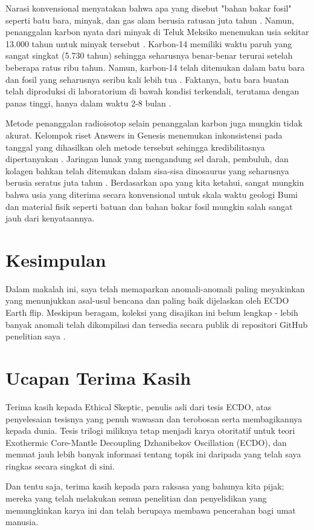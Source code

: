 \documentclass[10pt,twocolumn,letterpaper]{article}
\begin{document}
Narasi konvensional menyatakan bahwa apa yang disebut "bahan bakar fosil" seperti batu bara, minyak, dan gas alam berusia ratusan juta tahun \cite{104}. Namun, penanggalan karbon nyata dari minyak di Teluk Meksiko menemukan usia sekitar 13.000 tahun untuk minyak tersebut \cite{105}. Karbon-14 memiliki waktu paruh yang sangat singkat (5.730 tahun) sehingga seharusnya benar-benar terurai setelah beberapa ratus ribu tahun. Namun, karbon-14 telah ditemukan dalam batu bara dan fosil yang seharusnya seribu kali lebih tua \cite{106}. Faktanya, batu bara buatan telah diproduksi di laboratorium di bawah kondisi terkendali, terutama dengan panas tinggi, hanya dalam waktu 2-8 bulan \cite{107}.

Metode penanggalan radioisotop selain penanggalan karbon juga mungkin tidak akurat. Kelompok riset Answers in Genesis menemukan inkonsistensi pada tanggal yang dihasilkan oleh metode tersebut sehingga kredibilitasnya dipertanyakan \cite{108}. Jaringan lunak yang mengandung sel darah, pembuluh, dan kolagen bahkan telah ditemukan dalam sisa-sisa dinosaurus yang seharusnya berusia seratus juta tahun \cite{109,110}. Berdasarkan apa yang kita ketahui, sangat mungkin bahwa usia yang diterima secara konvensional untuk skala waktu geologi Bumi dan material fisik seperti batuan dan bahan bakar fosil mungkin salah sangat jauh dari kenyataannya.

\section{Kesimpulan}

Dalam makalah ini, saya telah memaparkan anomali-anomali paling meyakinkan yang menunjukkan asal-usul bencana dan paling baik dijelaskan oleh ECDO Earth flip. Meskipun beragam, koleksi yang disajikan ini belum lengkap - lebih banyak anomali telah dikompilasi dan tersedia secara publik di repositori GitHub penelitian saya \cite{2}.

\section{Ucapan Terima Kasih}

Terima kasih kepada Ethical Skeptic, penulis asli dari tesis ECDO, atas penyelesaian tesisnya yang penuh wawasan dan terobosan serta membagikannya kepada dunia. Tesis trilogi miliknya \cite{1} tetap menjadi karya otoritatif untuk teori Exothermic Core-Mantle Decoupling Dzhanibekov Oscillation (ECDO), dan memuat jauh lebih banyak informasi tentang topik ini daripada yang telah saya ringkas secara singkat di sini.

Dan tentu saja, terima kasih kepada para raksasa yang bahunya kita pijak; mereka yang telah melakukan semua penelitian dan penyelidikan yang memungkinkan karya ini dan telah berupaya membawa pencerahan bagi umat manusia.
{\small
\renewcommand{\refname}{References}


}
\end{document}
